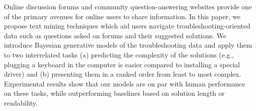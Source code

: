 Online discussion forums and community question-answering websites provide one of the primary avenues for online users to share information. In this paper, we propose text mining techniques which aid users navigate troubleshooting-oriented data such as questions asked on forums and their suggested solutions. We introduce Bayesian generative models of the troubleshooting data and apply them to two interrelated tasks (a) predicting the complexity of the solutions (e.g., plugging a keyboard in the computer is easier compared to installing a special driver) and (b) presenting them in a ranked order from least to most complex. Experimental results show that our models are on par with human performance on these tasks, while outperforming baselines based on solution length or readability.
